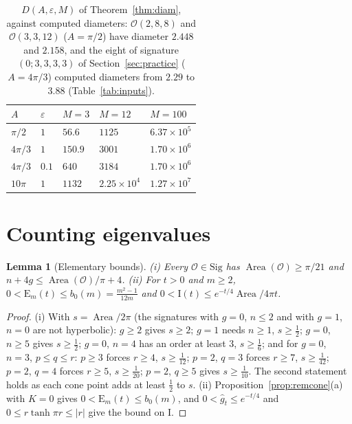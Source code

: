 \documentclass[pdflatex,sn-mathphys-num]{sn-jnl}
\theoremstyle{thmstyleone}%
\newtheorem{lemma}[theorem]{Lemma}%
\theoremstyle{thmstylethree}%
\newcommand{\Orb}{\mathcal{O}}
\newcommand{\Sig}{\mathrm{Sig}}
\newcommand{\Area}{\operatorname{Area}}
\begin{document}
\begin{table}[h]
\centering\footnotesize
\caption{$D(A,\varepsilon,M)$ of Theorem~\ref{thm:diam}, against computed diameters: $\Orb(2,8,8)$ and $\Orb(3,3,12)$ ($A=\pi/2$) have diameter $2.448$ and $2.158$, and the eight of signature $(0;3,3,3,3)$ of Section~\ref{sec:practice} ($A=4\pi/3$) computed diameters from $2.29$ to $3.88$ (Table~\ref{tab:inputs}).}\label{tab:D}
\begin{tabular}{@{}lllll@{}}
\toprule
$A$ & $\varepsilon$ & $M=3$ & $M=12$ & $M=100$\\
\midrule
$\pi/2$ & $1$ & $56.6$ & $1125$ & $6.37\times10^5$\\
$4\pi/3$ & $1$ & $150.9$ & $3001$ & $1.70\times10^6$\\
$4\pi/3$ & $0.1$ & $640$ & $3184$ & $1.70\times10^6$\\
$10\pi$ & $1$ & $1132$ & $2.25\times10^4$ & $1.27\times10^7$\\
\bottomrule
\end{tabular}
\end{table}

\section{Counting eigenvalues}\label{sec:count}

\begin{lemma}[Elementary bounds]\label{lem:elem}
(i) Every $\Orb\in\Sig$ has $\Area(\Orb)\ge\pi/21$ and $n+4g\le\Area(\Orb)/\pi+4$. (ii) For $t>0$ and $m\ge2$, $0<\mathrm E_m(t)\le b_0(m)=\frac{m^2-1}{12m}$ and $0<\mathrm I(t)\le e^{-t/4}\Area/4\pi t$.
\end{lemma}

\begin{proof}
(i) With $s=\Area/2\pi$ (the signatures with $g=0$, $n\le2$ and with $g=1$, $n=0$ are not hyperbolic): $g\ge2$ gives $s\ge2$; $g=1$ needs $n\ge1$, $s\ge\frac12$; $g=0$, $n\ge5$ gives $s\ge\frac12$; $g=0$, $n=4$ has an order at least $3$, $s\ge\frac16$; and for $g=0$, $n=3$, $p\le q\le r$: $p\ge3$ forces $r\ge4$, $s\ge\frac1{12}$; $p=2$, $q=3$ forces $r\ge7$, $s\ge\frac1{42}$; $p=2$, $q=4$ forces $r\ge5$, $s\ge\frac1{20}$; $p=2$, $q\ge5$ gives $s\ge\frac1{10}$. The second statement holds as each cone point adds at least $\frac12$ to $s$. (ii) Proposition~\ref{prop:remcone}(a) with $K=0$ gives $0<\mathrm E_m(t)\le b_0(m)$, and $0<\hat g_t\le e^{-t/4}$ and $0\le r\tanh\pi r\le|r|$ give the bound on $\mathrm I$.
\end{proof}
\end{document}
